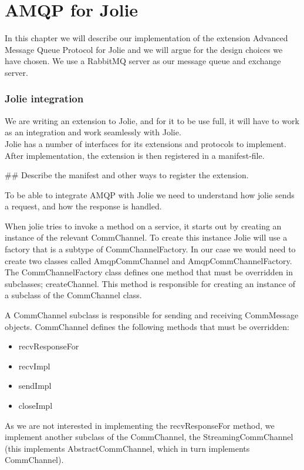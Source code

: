 \section{AMQP for Jolie}
In this chapter we will describe our implementation of the extension Advanced Message Queue Protocol for Jolie and we will argue for the design choices we have chosen. We use a RabbitMQ\cite{RabbitMQ} server as our message queue and exchange server.
\subsubsection{Jolie integration}
We are writing an extension to Jolie, and for it to be use full, it will have to work as an integration and work seamlessly with Jolie.\\
Jolie has a number of interfaces for its extensions and protocols to implement. After implementation, the extension is then registered in a manifest-file.

\#\# Describe the manifest and other ways to register the extension.

To be able to integrate AMQP with Jolie we need to understand how jolie sends a request, and how the response is handled.

When jolie tries to invoke a method on a service, it starts out by creating an instance of the relevant CommChannel. To create this instance Jolie will use a factory that is a subtype of CommChannelFactory. In our case we would need to create two classes called AmqpCommChannel and AmqpCommChannelFactory. The CommChannelFactory class defines one method that must be overridden in subclasses; createChannel. This method is responsible for creating an instance of a subclass of the CommChannel class.

A CommChannel subclass is responsible for sending and receiving CommMessage objects. CommChannel defines the following methods that must be overridden:
\begin{itemize}
  \item{recvResponseFor}
  \item{recvImpl}
  \item{sendImpl}
  \item{closeImpl}
\end{itemize}

As we are not interested in implementing the recvResponseFor method, we implement another subclass of the CommChannel, the StreamingCommChannel (this implements AbstractCommChannel, which in turn implements CommChannel).

